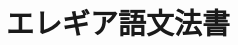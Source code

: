 \documentclass{jsbook}
\title{エレギア語文法書}
\date{}
\begin{document}

\frontmatter{}
\tableofcontents{}
\mainmatter{}











\backmatter{}
\printindex{}
\end{document}
